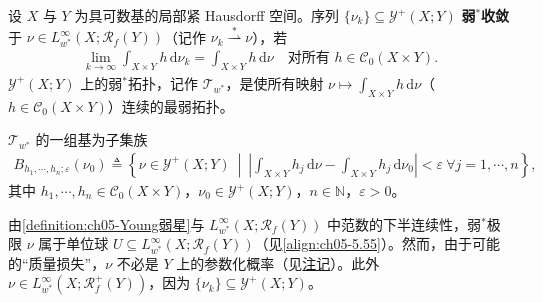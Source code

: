 \documentclass[../../main.tex]{subfiles}%
\begin{document}
\begin{definition}[弱$^*$收敛]\label{definition:ch05-Young弱星}
设 $X$ 与 $Y$ 为具可数基的局部紧 Hausdorff 空间。序列 $\{\nu_k\}\subseteq\mathcal{Y}^+(X;Y)$ \textbf{弱$^*$收敛}于 $\nu\in L^\infty_{w^*}(X;\mathscr{R}_f(Y))$（记作 $\nu_k\stackrel{*}{\rightharpoonup}\nu$），若
\begin{align}
\lim_{k\to\infty}\int_{X\times Y}h\,\mathrm{d}\nu_k
=\int_{X\times Y}h\,\mathrm{d}\nu
\quad\text{对所有 }h\in\mathcal{C}_0(X\times Y).\label{align:ch05-5.59a}
\end{align}
$\mathcal{Y}^+(X;Y)$ 上的弱$^*$拓扑，记作 $\mathcal{T}_{w^*}$，是使所有映射 $\nu\mapsto\int_{X\times Y}h\,\mathrm{d}\nu$（$h\in\mathcal{C}_0(X\times Y)$）连续的最弱拓扑。

$\mathcal{T}_{w^*}$ 的一组基为子集族
\begin{align}
B_{h_1,\cdots ,h_n;\varepsilon}(\nu_0)
\triangleq \left\{\nu\in\mathcal{Y}^+(X;Y)\ \middle|\
\left|\int_{X\times Y}h_j\,\mathrm{d}\nu-\int_{X\times Y}h_j\,\mathrm{d}\nu_0\right|<\varepsilon
\ \forall j=1,\cdots ,n\right\},\label{align:ch05-5.60}
\end{align}
其中 $h_1,\cdots ,h_n\in\mathcal{C}_0(X\times Y)$，$\nu_0\in\mathcal{Y}^+(X;Y)$，$n\in\mathbb{N}$，$\varepsilon>0$。
\end{definition}

\begin{remark}\label{remark:ch05-弱星损失质量}
由\cref{definition:ch05-Young弱星}与 $L^\infty_{w^*}(X;\mathscr{R}_f(Y))$ 中范数的下半连续性，弱$^*$极限 $\nu$ 属于单位球 $U\subseteq L^\infty_{w^*}(X;\mathscr{R}_f(Y))$（见\eqref{align:ch05-5.55}）。然而，由于可能的“质量损失”，$\nu$ 不必是 $Y$ 上的参数化概率（见\hyperref[remark:ch05-范数下半连续]{注记}）。此外 $\nu\in L^\infty_{w^*}(X;\mathscr{R}^+_f(Y))$，因为 $\{\nu_k\}\subseteq\mathcal{Y}^+(X;Y)$。
\end{remark}
\end{document}

